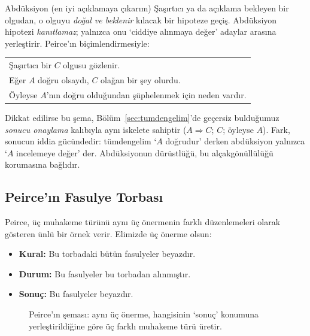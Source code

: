 \begin{tanim}{Abdüksiyon (en iyi açıklamaya çıkarım)}
Şaşırtıcı ya da açıklama bekleyen bir olgudan, o olguyu \emph{doğal ve beklenir} kılacak bir hipoteze geçiş. Abdüksiyon hipotezi \emph{kanıtlamaz}; yalnızca onu ‘ciddiye alınmaya değer’ adaylar arasına yerleştirir. Peirce’ın biçimlendirmesiyle:
\begin{center}
\begin{tabular}{l}
Şaşırtıcı bir $C$ olgusu gözlenir.\\
Eğer $A$ doğru olsaydı, $C$ olağan bir şey olurdu.\\
\hline
Öyleyse $A$’nın doğru olduğundan şüphelenmek için neden vardır.
\end{tabular}
\end{center}
\end{tanim}

Dikkat edilirse bu şema, Bölüm~\ref{sec:tumdengelim}’de geçersiz bulduğumuz \emph{sonucu onaylama} kalıbıyla aynı iskelete sahiptir ($A\Rightarrow C$; $C$; öyleyse $A$). Fark, sonucun iddia gücündedir: tümdengelim ‘$A$ doğrudur’ derken abdüksiyon yalnızca ‘$A$ incelemeye değer’ der. Abdüksiyonun dürüstlüğü, bu alçakgönüllülüğü korumasına bağlıdır.

\subsection{Peirce’ın Fasulye Torbası}

Peirce, üç muhakeme türünü aynı üç önermenin farklı düzenlemeleri olarak gösteren ünlü bir örnek verir. Elimizde üç önerme olsun:
\begin{itemize}[leftmargin=1.4em]
\item \textbf{Kural:} Bu torbadaki bütün fasulyeler beyazdır.
\item \textbf{Durum:} Bu fasulyeler bu torbadan alınmıştır.
\item \textbf{Sonuç:} Bu fasulyeler beyazdır.
\end{itemize}

\begin{figure}[h]
\centering
{}%
\caption{Peirce’ın şeması: aynı üç önerme, hangisinin ‘sonuç’ konumuna yerleştirildiğine göre üç farklı muhakeme türü üretir.}
\end{figure}


